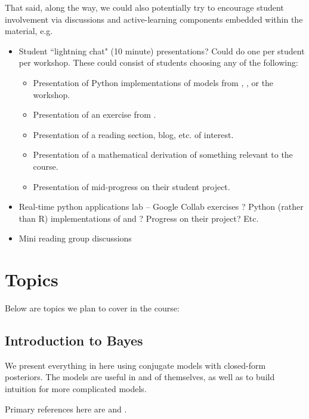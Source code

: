 \documentclass{article} %
\begin{document}
That said,  along the way,  we could also potentially try to encourage student involvement via discussions and active-learning components embedded within the material,  e.g.

\begin{itemize}

\item Student ``lightning chat" (10 minute) presentations?  Could do one per student per workshop.  These could consist of students choosing any of the following:
	\begin{itemize}
	\item Presentation of Python implementations of models from \cite{hoff2009first} ,  \cite{ gelman2013bayesian},  or the workshop.
	\item Presentation of an exercise from \cite{gelman2013bayesian}.
	\item Presentation of a reading section,  blog,  etc.  of interest.
	\item Presentation of a mathematical derivation of something relevant to the course.
	\item Presentation of mid-progress on their student project.
	\end{itemize}
\item Real-time python applications lab -- Google Collab exercises ?  Python (rather than R) implementations of \cite{hoff2009first} and \cite{gelman2013bayesian} ?  Progress on their project?  Etc.
\item Mini reading group discussions 
\end{itemize}


\section{Topics}

Below are topics we plan to cover in the course:

\subsection{Introduction to Bayes}

We present everything in here using conjugate models with closed-form posteriors.  The models are useful in and of themselves,  as well as to build intuition for more complicated models.   

Primary references here are \cite{hoff2009first} and \cite{gelman2013bayesian}.
\end{document}
